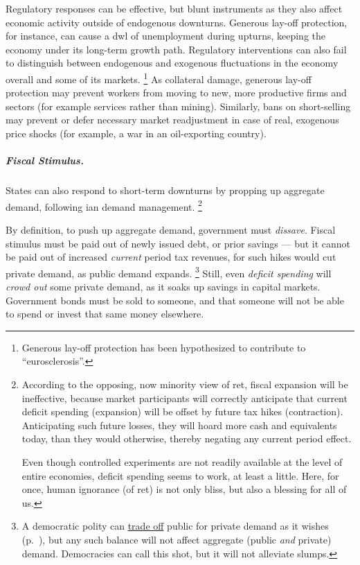 Regulatory responses can be effective, but blunt instruments as they also affect economic activity outside of endogenous downturns.
Generous lay-off protection, for instance, can cause a \gls{dwl} of unemployment during upturns, keeping the economy under its long-term growth path.
Regulatory interventions can also fail to distinguish between endogenous and exogenous fluctuations in the economy overall and some of its markets.
\footnote{
	Generous lay-off protection has been hypothesized to contribute to ``eurosclerosis''.
}
As collateral damage, generous lay-off protection may prevent workers from moving to new, more productive firms and sectors (for example services rather than mining).
Similarly, bans on short-selling may prevent or defer necessary market readjustment in case of real, exogenous price shocks (for example, a war in an oil-exporting country).

\subparagraph{Fiscal Stimulus.}
	\label{sec:fiscal-stimulus}
States can also respond to short-term downturns by propping up aggregate demand, following \citeauthor{Keynes1936}ian demand management.
\footnote{
	According to the opposing, now minority view of \gls{ret}, fiscal expansion will be ineffective, because market participants will correctly anticipate that current deficit spending (expansion) will be offset by future tax hikes (contraction).
	Anticipating such future losses, they will hoard more cash and equivalents today, than they would otherwise, thereby negating any current period effect.

	Even though controlled experiments are not readily available at the level of entire economies, deficit spending seems to work, at least a little.
	Here, for once, human ignorance (of \gls{ret}) is not only bliss, but also a blessing for all of us.
}

By definition, to push up aggregate demand, government must \emph{dissave}.
Fiscal stimulus must be paid out of newly issued debt, or prior savings --- but it cannot be paid out of increased \emph{current} period tax revenues, for such hikes would cut private demand, as public demand expands.
\footnote{
	A democratic polity can \hyperref[sec:trade-offs]{trade off} public for private demand as it wishes (p.~\pageref{sec:trade-offs}), but any such balance will not affect aggregate (public \emph{and} private) demand.
	Democracies can call this shot, but it will not alleviate slumps.
}
Still, even \emph{deficit spending} will \emph{crowd out} some private demand, as it soaks up savings in capital markets.
Government bonds must be sold to someone, and that someone will not be able to spend or invest that same money elsewhere.

